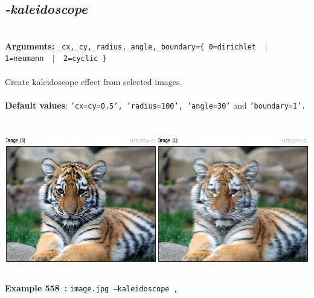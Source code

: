 \documentclass[a4paper,11pt,twoside]{book}
\begin{document}
\subsection{\emph{-kaleidoscope} }\vspace*{-0.5em}
~\\\textbf{Arguments: } 
{\small \texttt{\_cx,\_cy,\_radius,\_angle,\_boundary=\{ 0=dirichlet ~$|$~ 1=neumann ~$|$~ 2=cyclic \}}}\\~\\
Create kaleidoscope effect from selected images.
~\\~\\\textbf{Default values}: {\small \texttt{'cx=cy=0.5', 'radius=100', 'angle=30'} and \texttt{'boundary=1'.}}
\begin{center}\includegraphics[keepaspectratio=true,height=7cm,width=\textwidth]{img/gmic_def558.jpg}\\
{\footnotesize \textbf{Example 558~:} \texttt{image.jpg --kaleidoscope ,}}
\end{center}
\end{document}
